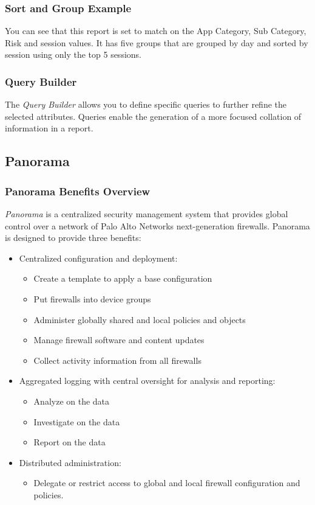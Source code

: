 \subsubsection{Sort and Group Example}
You can see that this report is set to match on the App Category, Sub Category, Risk and session values.
It has five groups that are grouped by day and sorted by session using only the top 5 sessions.

\subsubsection{Query Builder}
The \textit{Query Builder} allows you to define specific queries to further refine the selected attributes.
Queries enable the generation of a more focused collation of information in a report.

\subsection{Panorama}
\subsubsection{Panorama Benefits Overview}
\textit{Panorama} is a centralized security management system that provides global control over a network of Palo Alto Networks next-generation firewalls. Panorama is designed to provide three benefits:
\begin{itemize}
    \item Centralized configuration and deployment:
        \begin{itemize}
            \item Create a template to apply a base configuration
            \item Put firewalls into device groups
            \item Administer globally shared and local policies and objects
            \item Manage firewall software and content updates
            \item Collect activity information from all firewalls
        \end{itemize}
    \item Aggregated logging with central oversight for analysis and reporting:
        \begin{itemize}
            \item Analyze on the data
            \item Investigate on the data
            \item Report on the data
        \end{itemize}
    \item Distributed administration:
        \begin{itemize}
            \item Delegate or restrict access to global and local firewall configuration and policies.
        \end{itemize}
\end{itemize}

